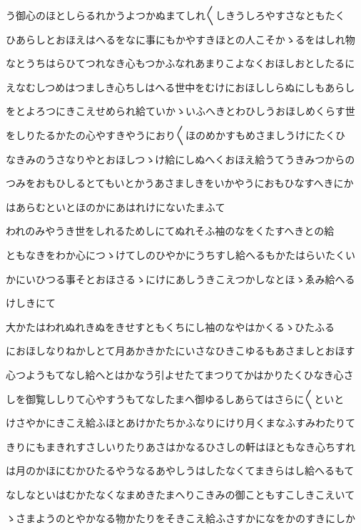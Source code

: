 \documentclass[a4paper,11pt,landscape]{ltjtarticle}
\begin{document}
う御心のほとしらるれかうよつかぬまてしれ〱しきうしろやすさなともたく
\par\medskip
ひあらしとおほえはへるをなに事にもかやすきほとの人こそかゝるをはしれ物
\par\medskip
なとうちはらひてつれなき心もつかふなれあまりこよなくおほしおとしたるに
\par\medskip
えなむしつめはつましき心ちしはへる世中をむけにおほししらぬにしもあらし
\par\medskip
をとよろつにきこえせめられ給ていかゝいふへきとわひしうおほしめくらす世
\par\medskip
をしりたるかたの心やすきやうにおり〱ほのめかすもめさましうけにたくひ
\par\medskip
なきみのうさなりやとおほしつゝけ給にしぬへくおほえ給うてうきみつからの
\par\medskip
つみをおもひしるとてもいとかうあさましきをいかやうにおもひなすへきにか
\par\medskip
はあらむといとほのかにあはれけにないたまふて
\par\medskip
われのみやうき世をしれるためしにてぬれそふ袖のなをくたすへきとの給
\par\medskip
ともなきをわか心につゝけてしのひやかにうちすし給へるもかたはらいたくい
\par\medskip
かにいひつる事そとおほさるゝにけにあしうきこえつかしなとほゝゑみ給へる
\par\medskip
けしきにて
\par\medskip
大かたはわれぬれきぬをきせすともくちにし袖のなやはかくるゝひたふる
\par\medskip
におほしなりねかしとて月あかきかたにいさなひきこゆるもあさましとおほす
\par\medskip
心つようもてなし給へとはかなう引よせたてまつりてかはかりたくひなき心さ
\par\medskip
しを御覧ししりて心やすうもてなしたまへ御ゆるしあらてはさらに〱といと
\par\medskip
けさやかにきこえ給ふほとあけかたちかふなりにけり月くまなふすみわたりて
\par\medskip
きりにもまきれすさしいりたりあさはかなるひさしの軒はほともなき心ちすれ
\par\medskip
は月のかほにむかひたるやうなるあやしうはしたなくてまきらはし給へるもて
\par\medskip
なしなといはむかたなくなまめきたまへりこきみの御こともすこしきこえいて
\par\medskip
ゝさまようのとやかなる物かたりをそきこえ給ふさすかになをかのすきにしか
\par\medskip
\end{document}
